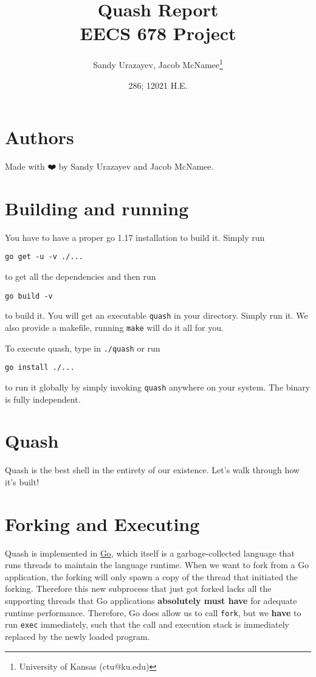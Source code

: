 \documentclass[12pt]{article}
\author{Sandy Urazayev, Jacob McNamee\thanks{University of Kansas (ctu@ku.edu)}}
\date{286; 12021 H.E.}
\title{Quash Report\\\medskip
\large EECS 678 Project \rom{1}}
\begin{document}
\maketitle
\tableofcontents


\section{Authors}
\label{sec:org745cfa9}
Made with ❤️ by Sandy Urazayev and Jacob McNamee.
\section{Building and running}
\label{sec:org3a8fb11}
You have to have a proper go 1.17 installation to build it. Simply run
\begin{verbatim}
go get -u -v ./...
\end{verbatim}
to get all the dependencies and then run
\begin{verbatim}
go build -v
\end{verbatim}
to build it. You will get an executable \texttt{quash} in your directory. Simply run
it. We also provide a makefile, running \texttt{make} will do it all for you.

To execute quash, type in \texttt{./quash} or run
\begin{verbatim}
go install ./...
\end{verbatim}
to run it globally by simply invoking \texttt{quash} anywhere on your system. The
binary is fully independent.
\section{Quash}
\label{sec:org7a3a191}
Quash is the best shell in the entirety of our existence. Let's walk through
how it's built!
\section{Forking and Executing}
\label{sec:org2e68f32}
Quash is implemented in \href{https://golang.org}{Go}, which itself is a garbage-collected language that
runs threads to maintain the language runtime. When we want to fork from a Go
application, the forking will only spawn a copy of the thread that initiated
the forking. Therefore this new subprocess that just got forked lacks all the
supporting threads that Go applications \textbf{absolutely must have} for adequate
runtime performance. Therefore, Go does allow us to call \texttt{fork}, but we \textbf{have} to
run \texttt{exec} immediately, such that the call and execution stack is immediately
replaced by the newly loaded program.
\end{document}
